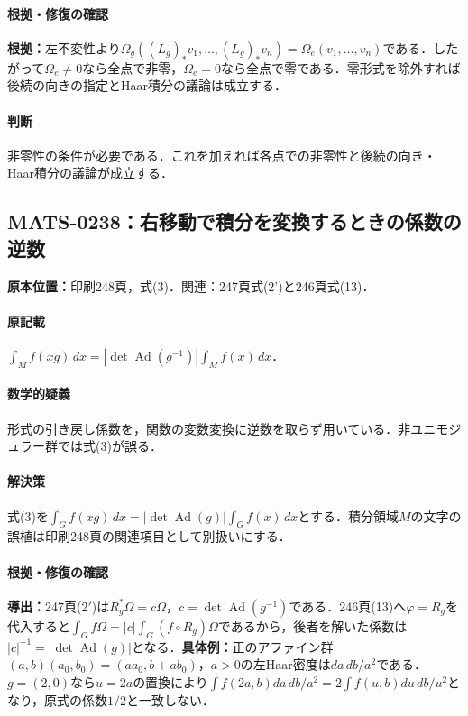 \documentclass[a4paper,10pt]{ltjsarticle}
\begin{document}
\paragraph{根拠・修復の確認}\textbf{根拠：}左不変性より$\Omega_g((L_g)_*v_1,\ldots,(L_g)_*v_n)=\Omega_e(v_1,\ldots,v_n)$である．したがって$\Omega_e\ne0$なら全点で非零，$\Omega_e=0$なら全点で零である．零形式を除外すれば後続の向きの指定とHaar積分の議論は成立する．

\paragraph{判断}非零性の条件が必要である．これを加えれば各点での非零性と後続の向き・Haar積分の議論が成立する．


\subsection*{MATS-0238：右移動で積分を変換するときの係数の逆数}\label{math:MATS-0238}
\noindent\textbf{原本位置：}印刷248頁，式(3)．関連：247頁式(2')と246頁式(13)．

\paragraph{原記載}$\int_M f(xg)\,dx=|\det\operatorname{Ad}(g^{-1})|\int_M f(x)\,dx$．

\paragraph{数学的疑義}形式の引き戻し係数を，関数の変数変換に逆数を取らず用いている．非ユニモジュラー群では式(3)が誤る．

\paragraph{解決策}式(3)を$\displaystyle\int_G f(xg)\,dx=|\det\operatorname{Ad}(g)|\int_G f(x)\,dx$とする．積分領域$M$の文字の誤植は印刷248頁の関連項目として別扱いにする．

\paragraph{根拠・修復の確認}\textbf{導出：}247頁(2$\prime$)は$R_g^*\Omega=c\Omega$，$c=\det\operatorname{Ad}(g^{-1})$である．246頁(13)へ$\varphi=R_g$を代入すると$\int_G f\Omega=|c|\int_G(f\circ R_g)\Omega$であるから，後者を解いた係数は$|c|^{-1}=|\det\operatorname{Ad}(g)|$となる．\textbf{具体例：}正のアファイン群$(a,b)(a_0,b_0)=(aa_0,b+ab_0)$，$a>0$の左Haar密度は$da\,db/a^2$である．$g=(2,0)$なら$u=2a$の置換により$\int f(2a,b)da\,db/a^2=2\int f(u,b)du\,db/u^2$となり，原式の係数$1/2$と一致しない．
\end{document}
